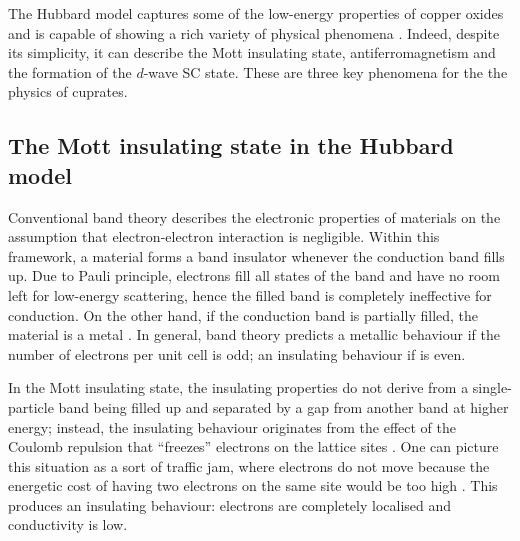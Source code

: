 The Hubbard model captures some of the low-energy properties of copper oxides \cite{zhang1988renormalised,lee2006doping} and is capable of showing a rich variety of physical phenomena \cite{scalapino2012common,arovas2022hubbard}. Indeed, despite its simplicity, it can describe the Mott insulating state, antiferromagnetism and the formation of the $d$-wave SC state. These are three key phenomena for the the physics of cuprates.

\subsection{The Mott insulating state in the Hubbard model}\label{subsec:mott-cuprates}

Conventional band theory describes the electronic properties of materials on the assumption that electron-electron interaction is negligible. Within this framework, a material forms a band insulator whenever the conduction band fills up. Due to Pauli principle, electrons fill all states of the band and have no room left for low-energy scattering, hence the filled band is completely ineffective for conduction. On the other hand, if the conduction band is partially filled, the material is a metal \cite{grosso2014solid}. In general, band theory predicts a metallic behaviour if the number of electrons per unit cell is odd; an insulating behaviour if is even.

In the Mott insulating state, the insulating properties do not derive from a single-particle band being filled up and separated by a gap from another band at higher energy; instead, the insulating behaviour originates from the effect of the Coulomb repulsion that ``freezes'' electrons on the lattice sites \cite{keimer2015quantum}. One can picture this situation as a sort of traffic jam, where electrons do not move because the energetic cost of having two electrons on the same site would be too high \cite{zaanen2007watching}. This produces an insulating behaviour: electrons are completely localised and conductivity is low.

%	

